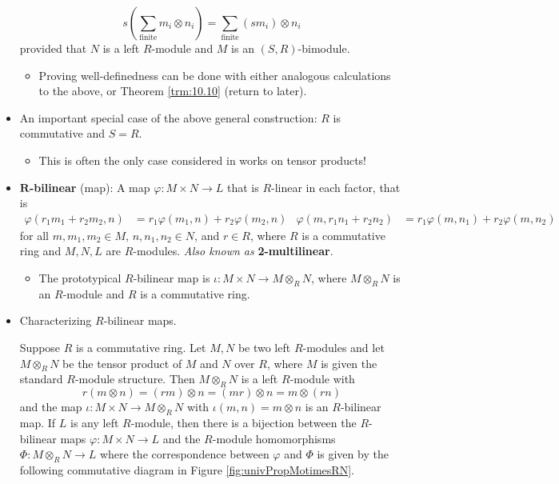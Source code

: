 \documentclass[../notes.tex]{subfiles}
\begin{document}
\begin{itemize}
    \begin{equation*}
        s\left( \sum_\text{finite}m_i\otimes n_i \right) = \sum_\text{finite}(sm_i)\otimes n_i
    \end{equation*}
    provided that $N$ is a left $R$-module and $M$ is an $(S,R)$-bimodule.
    \begin{itemize}
        \item Proving well-definedness can be done with either analogous calculations to the above, or Theorem \ref{trm:10.10} (return to later).
    \end{itemize}
    \item An important special case of the above general construction: $R$ is commutative and $S=R$.
    \begin{itemize}
        \item This is often the only case considered in works on tensor products!
    \end{itemize}
    \item \textbf{$\bm{R}$-bilinear} (map): A map $\varphi:M\times N\to L$ that is $R$-linear in each factor, that is
    \begin{align*}
        \varphi(r_1m_1+r_2m_2,n) &= r_1\varphi(m_1,n)+r_2\varphi(m_2,n)&
        \varphi(m,r_1n_1+r_2n_2) &= r_1\varphi(m,n_1)+r_2\varphi(m,n_2)
    \end{align*}
    for all $m,m_1,m_2\in M$, $n,n_1,n_2\in N$, and $r\in R$, where $R$ is a commutative ring and $M,N,L$ are $R$-modules. \emph{Also known as} \textbf{2-multilinear}.
    \begin{itemize}
        \item The prototypical $R$-bilinear map is $\iota:M\times N\to M\otimes_RN$, where $M\otimes_RN$ is an $R$-module and $R$ is a commutative ring.
    \end{itemize}
    \item Characterizing $R$-bilinear maps.
    \begin{corollary}\label{cly:10.12}
        Suppose $R$ is a commutative ring. Let $M,N$ be two left $R$-modules and let $M\otimes_RN$ be the tensor product of $M$ and $N$ over $R$, where $M$ is given the standard $R$-module structure. Then $M\otimes_RN$ is a left $R$-module with
        \begin{equation*}
            r(m\otimes n) = (rm)\otimes n
            = (mr)\otimes n
            = m\otimes(rn)
        \end{equation*}
        and the map $\iota:M\times N\to M\otimes_RN$ with $\iota(m,n)=m\otimes n$ is an $R$-bilinear map. If $L$ is any left $R$-module, then there is a bijection between the $R$-bilinear maps $\varphi:M\times N\to L$ and the $R$-module homomorphisms $\Phi:M\otimes_RN\to L$ where the correspondence between $\varphi$ and $\Phi$ is given by the following commutative diagram in Figure \ref{fig:univPropMotimesRN}.

\end{corollary}
\end{itemize}
\end{document}
